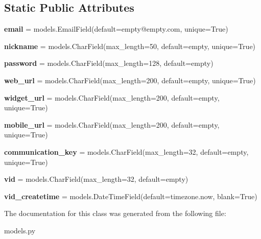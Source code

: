 \subsection*{Static Public Attributes}
\begin{DoxyCompactItemize}
\item 
\mbox{\label{classbackend_1_1models_1_1_admin_a9f4cd0f17f04e51e7f84370e0b8e07a6}} 
{\bfseries email} = models.\+Email\+Field(default=\textquotesingle{}empty@empty.\+com\textquotesingle{}, unique=True)
\item 
\mbox{\label{classbackend_1_1models_1_1_admin_a7d4b96d0e6b0de7e3507e20ff1a7423e}} 
{\bfseries nickname} = models.\+Char\+Field(max\+\_\+length=50, default=\textquotesingle{}empty\textquotesingle{}, unique=True)
\item 
\mbox{\label{classbackend_1_1models_1_1_admin_a92a3c7253d55521d5023e920a3912d4b}} 
{\bfseries password} = models.\+Char\+Field(max\+\_\+length=128, default=\textquotesingle{}empty\textquotesingle{})
\item 
\mbox{\label{classbackend_1_1models_1_1_admin_a46af403d6c5c4b2c7f027b938dcd9d8f}} 
{\bfseries web\+\_\+url} = models.\+Char\+Field(max\+\_\+length=200, default=\textquotesingle{}empty\textquotesingle{}, unique=True)
\item 
\mbox{\label{classbackend_1_1models_1_1_admin_a331198c70d1f58519956404a29051844}} 
{\bfseries widget\+\_\+url} = models.\+Char\+Field(max\+\_\+length=200, default=\textquotesingle{}empty\textquotesingle{}, unique=True)
\item 
\mbox{\label{classbackend_1_1models_1_1_admin_a1ba9d0e63a707f31ee02452c2b781110}} 
{\bfseries mobile\+\_\+url} = models.\+Char\+Field(max\+\_\+length=200, default=\textquotesingle{}empty\textquotesingle{}, unique=True)
\item 
\mbox{\label{classbackend_1_1models_1_1_admin_ad2c1abda1a78f6a62b010508aee974f6}} 
{\bfseries communication\+\_\+key} = models.\+Char\+Field(max\+\_\+length=32, default=\textquotesingle{}empty\textquotesingle{}, unique=True)
\item 
\mbox{\label{classbackend_1_1models_1_1_admin_a58e77c2e717073f8a19e15c150619c8f}} 
{\bfseries vid} = models.\+Char\+Field(max\+\_\+length=32, default=\textquotesingle{}empty\textquotesingle{})
\item 
\mbox{\label{classbackend_1_1models_1_1_admin_aad82fd766356d3a0d7911f1076492a39}} 
{\bfseries vid\+\_\+createtime} = models.\+Date\+Time\+Field(default=timezone.\+now, blank=True)
\end{DoxyCompactItemize}


The documentation for this class was generated from the following file\+:\begin{DoxyCompactItemize}
\item 
models.\+py\end{DoxyCompactItemize}
